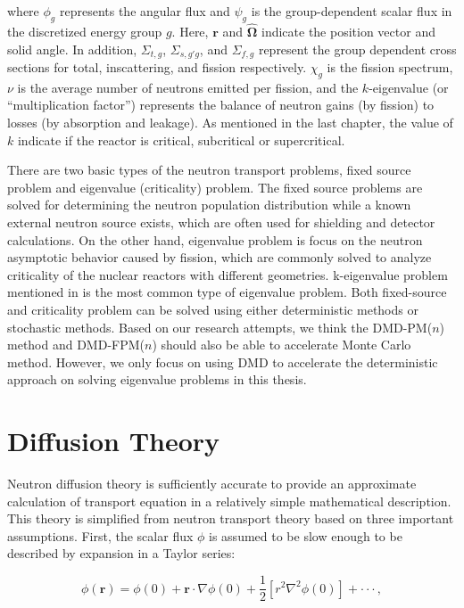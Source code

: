 where $\phi_g$ represents the angular flux and $\psi_g$ is the group-dependent scalar flux in the discretized energy group $g$.  
Here, $\mathbf{r}$ and $\bm{\hat{\Omega}}$ indicate the position vector and solid angle.
In addition, $\Sigma_{t,g}$, $\Sigma_{s,g\prime g}$, and $\Sigma_{f,g}$ represent the group dependent cross sections for total, inscattering, and fission respectively.  
$\chi_g$ is the fission spectrum, $\nu$ is the average number of neutrons emitted per fission, and the $k$-eigenvalue (or ``multiplication factor'') represents the balance of neutron gains (by fission) to losses (by absorption and leakage).  
As mentioned in the last chapter, the value of $k$ indicate if the reactor is critical, subcritical or supercritical.

There are two basic types of the neutron transport problems, fixed source problem and eigenvalue (criticality) problem.  
The fixed source problems are solved for determining the neutron population distribution while a known external neutron source exists, which are often used for shielding and detector calculations.
On the other hand, eigenvalue problem is focus on the neutron asymptotic behavior caused by fission, which are commonly solved to analyze criticality of the nuclear reactors with different geometries.
k-eigenvalue problem mentioned in  is the most common type of eigenvalue problem.
Both fixed-source and criticality problem can be solved using either deterministic methods or stochastic methods.
Based on our research attempts, we think the DMD-PM($n$) method and DMD-FPM($n$) should also be able to accelerate Monte Carlo method. 
However, we only focus on using DMD to accelerate the deterministic approach on solving eigenvalue problems in this thesis.

\section{Diffusion Theory}
Neutron diffusion theory is sufficiently accurate to provide an approximate calculation of transport equation in a relatively simple mathematical description.
This theory is simplified from neutron transport theory based on three important assumptions\cite{stacey2018nuclear}.
First, the scalar flux $\phi$ is assumed to be slow enough to be described by expansion in a Taylor series:

\begin{equation}
 \phi(\mathbf{r}) = \phi(0) + \mathbf{{r}} \cdot \nabla \phi(0) + \frac{1}{2}[r^2 \nabla^2 \phi(0)] + \cdot \cdot \cdot  \, ,
 \label{eq:taylor}
\end{equation}


